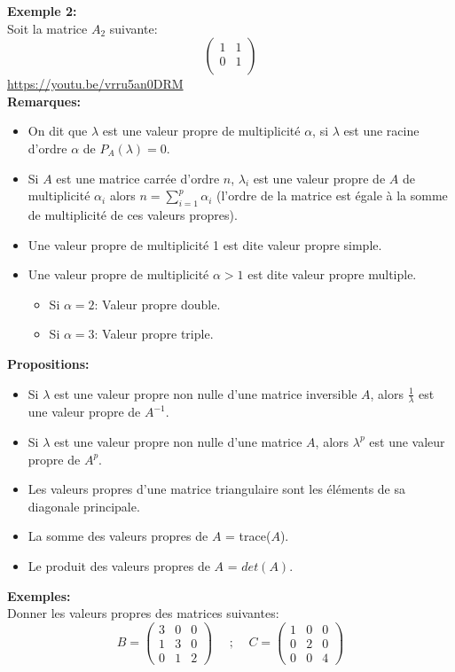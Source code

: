 \documentclass[a4paper,12pt,french]{article}
\begin{document}
	\textbf{Exemple 2:}\\
	Soit la matrice $A_{2}$ suivante:
	\[\begin{pmatrix}
		1 & 1  \\
		0 & 1 \\
		
	\end{pmatrix}\] 
	\url{https://youtu.be/vrru5an0DRM}\\
	\textbf{Remarques:}
	\begin{itemize}
		\item On dit que $\lambda$ est une valeur propre de multiplicité $\alpha$, si $\lambda$ est une racine d'ordre $\alpha$ de $P_{A}(\lambda)=0$.
		\item Si $A$ est une matrice carrée d'ordre $n$, $\lambda_{i}$ est une valeur propre de $A$ de multiplicité $\alpha_{i}$ alors $n=\sum_{i=1}^{p}\alpha_{i}$ (l'ordre de la matrice est égale à la somme de multiplicité de ces valeurs propres).
		\item Une valeur propre de multiplicité 1 est dite valeur propre simple.
		\item Une valeur propre de multiplicité $\alpha >1$ est dite valeur propre multiple.
		\begin{itemize}
			\item Si $\alpha=2$: Valeur propre double.
			\item Si $\alpha=3$: Valeur propre triple.
		\end{itemize}
	\end{itemize}
	
	\textbf{Propositions:}
	\begin{itemize}
		\item Si $\lambda$ est une valeur propre non nulle d'une matrice inversible $A$, alors $\frac{1}{\lambda}$ est une valeur propre de $A^{-1}$.
		\item Si $\lambda$ est une valeur propre non nulle d'une matrice $A$, alors  $\lambda ^{p}$ est une valeur propre de $A^p$.
		\item Les valeurs propres d'une matrice triangulaire sont les éléments de sa diagonale principale.
		\item La somme des valeurs propres de $A$ = trace($A$).
		\item Le produit des valeurs propres de $A$ = $det(A)$.
	\end{itemize}
	\textbf{Exemples:}\\
	Donner les valeurs propres des matrices suivantes:
	\[B=\begin{pmatrix}
		3 & 0 & 0  \\
		1 & 3 & 0 \\
		0 & 1 & 2
		
	\end{pmatrix}	~~~~~~;~~~~~ C=\begin{pmatrix}
		1 & 0 & 0  \\
		0 & 2 & 0 \\
		0 & 0 & 4
		
	\end{pmatrix}\] 
	
\end{document}
